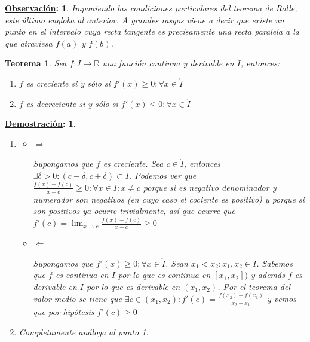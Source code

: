 \documentclass[10pt,a4paper,openright]{book}
\theoremstyle{break}
\newtheorem*{theo}{Teorema}
\newtheorem*{demo}{\underline{Demostración}:}
\newtheorem*{obs}{\underline{Observación}:}
\begin{document}
\begin{obs}
Imponiendo las condiciones particulares del teorema de Rolle, este último engloba al anterior. A grandes rasgos viene a decir que existe un punto en el intervalo cuya recta tangente es precisamente una recta paralela a la que atraviesa $f(a)$ y $f(b)$.
\end{obs}

\begin{theo}
Sea $f:I\rightarrow\mathbb R$ una función continua y derivable en $\mathring{I}$, entonces:
\begin{enumerate}
\item $f$ es creciente si y sólo si $f'(x)\geq 0: \forall x\in \mathring{I}$
\item $f$ es decreciente si y sólo si $f'(x)\leq 0: \forall x\in \mathring{I}$
\end{enumerate}
\end{theo}
\begin{demo}
\begin{enumerate}
\item
	\begin{itemize}
	\item $\Rightarrow$
	
	Supongamos que $f$ es creciente. Sea $c\in \mathring{I}$, entonces $\exists \delta>0: (c-\delta, c+\delta)\subset I$. Podemos ver que $\frac{f(x)-f(c)}{x-c}\geq 0: \forall x\in I: x\neq c$ porque si es negativo denominador y numerador son negativos (en cuyo caso el cociente es positivo) y porque si son positivos ya ocurre trivialmente, así que ocurre que $f'(c)=\lim_{x\rightarrow c} \frac{f(x)-f(c)}{x-c} \geq 0$
	
	\item $\Leftarrow$
	
	Supongamos que $f'(x)\geq 0: \forall x \in \mathring{I}$. Sean $x_1<x_2: x_1,x_2\in I$. Sabemos que $f$ es continua en $I$ por lo que es continua en $[x_1,x_2])$ y además $f$ es derivable en $I$ por lo que es derivable en $(x_1,x_2)$. Por el teorema del valor medio se tiene que $\exists c\in (x_1,x_2): f'(c)=\frac{f(x_2)-f(x_1)}{x_2-x_1}$ y vemos que por hipótesis $f'(c)\geq 0$	
	\end{itemize}
	
\item Completamente análoga al punto 1.
\end{enumerate}
\end{demo}
\end{document}
